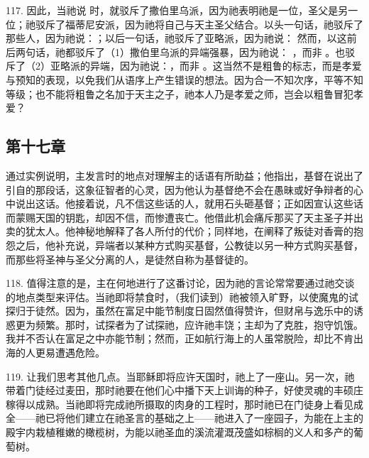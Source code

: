 117. 因此，当祂说  时，就驳斥了撒伯里乌派，因为祂表明祂是一位，圣父是另一位；祂驳斥了福蒂尼安派，因为祂将自己与天主圣父结合。以头一句话，祂驳斥了那些人，因为祂说：；以后一句话，祂驳斥了亚略派，因为祂说： 然而，以这前后两句话，祂都驳斥了（1）撒伯里乌派的异端强暴，因为祂说： ，而非  。也驳斥了（2）亚略派的异端，因为祂说：，而非 。这当然不是粗鲁的标志，而是孝爱与预知的表现，以免我们从语序上产生错误的想法。因为合一不知次序，平等不知等级；也不能将粗鲁之名加于天主之子，祂本人乃是孝爱之师，岂会以粗鲁冒犯孝爱？\par


\subsection{第十七章}

通过实例说明，主发言时的地点对理解主的话语有所助益；他指出，基督在说出了引自的那段话，这象征智者的心灵，因为他认为基督绝不会在愚昧或好争辩者的心中说出这话。他接着说，凡不信这些话的人，就用石头砸基督；正如因宣认这些话而蒙赐天国的钥匙，却因不信，而惨遭丧亡。他借此机会痛斥那买了天主圣子并出卖的犹太人。他神秘地解释了各人所付的代价；同样地，在阐释了叛徒对香膏的抱怨之后，他补充说，异端者以某种方式购买基督，公教徒以另一种方式购买基督，而那些将圣神与圣父分离的人，是徒然自称为基督徒的。\par

118. 值得注意的是，主在何地进行了这番讨论，因为祂的言论常常要通过祂交谈的地点类型来评估。当祂即将禁食时，（我们读到）祂被领入旷野，以使魔鬼的试探归于徒然。因为，虽然在富足中能节制度日固然值得赞许，但财帛与逸乐中的诱惑更为频繁。那时，试探者为了试探祂，应许祂丰饶；主却为了克胜，抱守饥饿。我并不否认在富足之中亦能节制；然而，正如航行海上的人虽常脱险，却比不肯出海的人更易遭遇危险。\par

119. 让我们思考其他几点。当耶稣即将应许天国时，祂上了一座山。另一次，祂带着门徒经过麦田，那时祂要在他们心中播下天上训诲的种子，好使灵魂的丰硕庄稼得以成熟。当祂即将完成祂所摄取的肉身的工程时，那时祂已在门徒身上看见成全——祂已将他们建立在祂圣言的基础之上——祂进入了一座园子，为能在上主的殿宇内栽植稚嫩的橄榄树，为能以祂圣血的溪流灌溉茂盛如棕榈的义人和多产的葡萄树。\par

